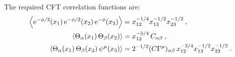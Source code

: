 The required CFT correlation functions are:
\begin{subequations} \label{12.4.6}
	\begin{align}
		\Bigl\langle \mathrm{e}^{-\phi/2}(x_{1})\,\mathrm{e}^{-\phi/2}(x_{2})\,\mathrm{e}^{-\phi}(x_{3})\Bigr\rangle &= x_{12}^{-1/4}x_{13}^{-1/2}x_{23}^{-1/2} \:, \label{12.4.6a} \\
		\langle \Theta_{\alpha}(x_{1})\,\Theta_{\beta}(x_{2})\rangle &= x_{12}^{-5/4}\,C_{\alpha\beta} \:, \label{12.4.6b} \\
		\langle \Theta_{\alpha}(x_{1})\,\Theta_{\beta}(x_{2})\,\psi^{\mu}(x_{3})\rangle &= 2^{-1/2}(C\Gamma^{\mu})_{\alpha\beta}\,x_{12}^{-3/4}x_{13}^{-1/2}x_{23}^{-1/2} \:. \label{12.4.6c}
	\end{align}
\end{subequations}

